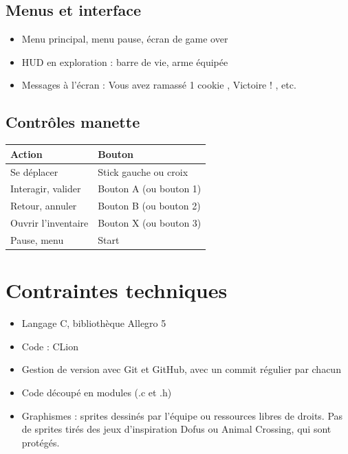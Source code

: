\documentclass[11pt,a4paper]{article}
\begin{document}
\begin{itemize}
\subsection{Menus et interface}
\begin{itemize}
    \item Menu principal, menu pause, écran de game over
    \item HUD en exploration : barre de vie, arme équipée
    \item Messages à l'écran : \og Vous avez ramassé 1 cookie \fg{}, \og Victoire ! \fg{}, etc.
\end{itemize}

\subsection{Contrôles manette}

\begin{center}
\begin{tabular}{>{\raggedright}p{6cm} p{6cm}}
    \toprule
    \textbf{Action} & \textbf{Bouton} \\
    \midrule
    Se déplacer & Stick gauche ou croix \\
    Interagir, valider & Bouton A (ou bouton 1) \\
    Retour, annuler & Bouton B (ou bouton 2) \\
    Ouvrir l'inventaire & Bouton X (ou bouton 3) \\
    Pause, menu & Start \\
    \bottomrule
\end{tabular}
\end{center}

\section{Contraintes techniques}

\begin{itemize}
    \item Langage C, bibliothèque Allegro 5
    \item Code : CLion
    \item Gestion de version avec Git et GitHub, avec un commit régulier par chacun
    \item Code découpé en modules (.c et .h)
    \item Graphismes : sprites dessinés par l'équipe ou ressources libres de droits. Pas de sprites tirés des jeux d'inspiration Dofus ou Animal Crossing, qui sont protégés.
\end{itemize}


\end{itemize}
\end{document}
